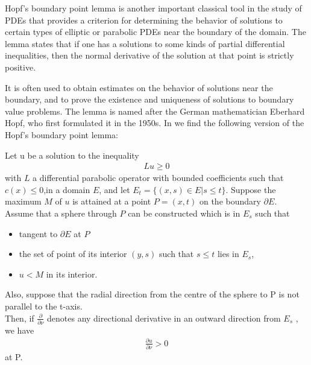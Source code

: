 Hopf's boundary point lemma is another important classical tool in the study of PDEs that provides a criterion for determining the behavior of solutions to certain types of elliptic or parabolic PDEs near the boundary of the domain. The lemma states that if one has a solutions to some kinds of partial differential inequalities, then the normal derivative of the solution at that point is strictly positive.

It is often used to obtain estimates on the behavior of solutions near the boundary, and to prove the existence and uniqueness of solutions to boundary value problems. The lemma is named after the German mathematician Eberhard Hopf, who first formulated it in the 1950s. In \cite{protterweinberger} we find the following version of the Hopf's boundary point lemma:

\begin{theorem}
	Let u be a solution to the inequality 
	\begin{align*}
		Lu\geq 0
	\end{align*} 
	with $L$ a differential parabolic operator with bounded coefficients such that $c(x)\leq 0$,in a domain $E$, and let $E_t = \{(x, s) \in E | s \leq t\}$. Suppose the maximum $M$ of $u$ is attained at a point $P=(x, t)$ on the boundary $\partial E$. \\
	Assume that a sphere through $P$ can be constructed which is in $E_s$ such that
	\begin{itemize}\itemsep0em 
		\item tangent to $\partial E$ at $P$
		\item the set of point of its interior $(y, s)$ such that $s\leq t$ lies in $E_s$, 
		\item  $u < M$ in its interior.
	\end{itemize}	
	Also, suppose that the radial direction from the centre of the sphere to P is not parallel to the t-axis. \\
	Then, if $\frac{\partial}{\partial \nu}$ denotes any directional derivative in an outward direction from $E_s$ , we have
	\begin{align*}
		\frac{\partial u}{\partial \nu} > 0
	\end{align*}
	at P.\label{HopfBPL}
\end{theorem}
